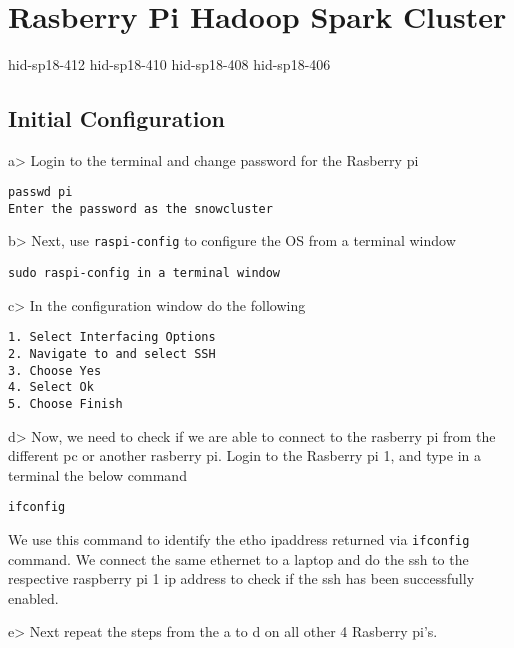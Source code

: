 \MDNAME\

\section{Rasberry Pi Hadoop Spark Cluster}

hid-sp18-412 hid-sp18-410 hid-sp18-408 hid-sp18-406

\subsection{Initial Configuration}

a\textgreater{} Login to the terminal and change password for the
Rasberry pi

\begin{lstlisting}
passwd pi
Enter the password as the snowcluster 
\end{lstlisting}

b\textgreater{} Next, use \texttt{raspi-config} to configure the OS from
a terminal window

\begin{lstlisting}
sudo raspi-config in a terminal window
\end{lstlisting}

c\textgreater{} In the configuration window do the following

\begin{lstlisting}
1. Select Interfacing Options
2. Navigate to and select SSH
3. Choose Yes
4. Select Ok
5. Choose Finish
\end{lstlisting}

d\textgreater{} Now, we need to check if we are able to connect to the
rasberry pi from the different pc or another rasberry pi. Login to the
Rasberry pi 1, and type in a terminal the below command

\begin{lstlisting}
ifconfig
\end{lstlisting}

We use this command to identify the etho ipaddress returned via
\texttt{ifconfig} command. We connect the same ethernet to a laptop and
do the ssh to the respective raspberry pi 1 ip address to check if the
ssh has been successfully enabled.

e\textgreater{} Next repeat the steps from the a to d on all other 4
Rasberry pi's.

